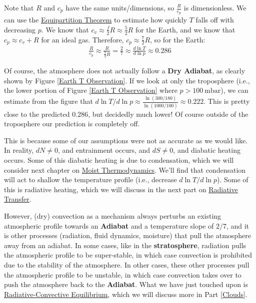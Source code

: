 Note that \(R\) and \(c_p\) have the same units/dimensions, so \(\frac{R}{c_p}\) is dimensionless. We can use the \hyperref[Equipartition]{Equipartition Theorem} to estimate how quickly \(T\) falls off with decreasing \(p\). We know that \(c_v\approx \frac{f}{2}R\approx\frac{5}{2}R\) for the Earth, and we know that \(c_p\approx c_v+R\) for an ideal gas. Therefore, \(c_p\approx \frac{7}{2}R\), so for the Earth:
\begin{align*}
    \frac{R}{c_p}\approx\frac{R}{\frac{7}{2}R}=\frac{2}{7}\approx\frac{d \ln T}{d \ln p}\approx0.286
\end{align*}

Of course, the atmosphere does not actually follow a \textbf{Dry Adiabat}, as clearly shown by Figure \ref{Earth T Observation}. If we look at only the troposphere (i.e., the lower portion of Figure \ref{Earth T Observation} where \(p>\qty{100}{\milli\bar}\)), we can estimate from the figure that \(d\ln T/d\ln p\approx \frac{\ln(300/180)}{\ln(1000/100)}\approx 0.222\). This is pretty close to the predicted \(0.286\), but decidedly much lower! Of course outside of the troposphere our prediction is completely off.

This is because some of our assumptions were not as accurate as we would like. In reality, \(dN\neq0\), and entrainment occurs, and \(dS\neq0\), and diabatic heating occurs. Some of this diabatic heating is due to condensation, which we will consider next chapter on \hyperref[Moist Thermodynamics]{Moist Thermodynamics}. We'll find that condensation will act to shallow the temperature profile (i.e., decrease \(d\ln T/d\ln p\)). Some of this is radiative heating, which we will discuss in the next part on \hyperref[Radiative Transfer]{Radiative Transfer}.

However, (dry) convection as a mechanism always perturbs an existing atmospheric profile towards an \textbf{Adiabat} and a temperature slope of \(2/7\), and it is other processes (radiation, fluid dynamics, moisture) that pull the atmosphere away from an adiabat. In some cases, like in the \textbf{stratosphere}, radiation pulls the atmospheric profile to be super-stable, in which case convection is prohibited due to the stability of the atmosphere. In other cases, these other processes pull the atmospheric profile to be unstable, in which case convection takes over to push the atmosphere back to the \textbf{Adiabat}. What we have just touched upon is \hyperref[Radiative-Convective Equilibrium]{Radiative-Convective Equilibrium}, which we will discuss more in Part \ref{Clouds}.

